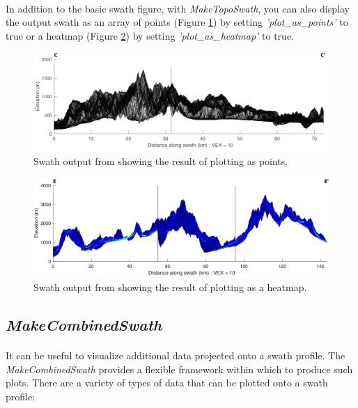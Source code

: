 \paragraph{}In addition to the basic swath figure, with \textit{MakeTopoSwath}, you can also display the output swath as an array of points (Figure \ref{fig:PointSwath}) by setting \textit{'plot\_as\_points'} to true or a heatmap (Figure \ref{fig:HeatSwath}) by setting \textit{'plot\_as\_heatmap'} to true.

\begin{figure}[H]
	\centering
	\includegraphics[width=16.5cm]{PNGs/SantAnaSwath_Points.png}
	\caption{Swath output from  showing the result of plotting as points.}
	\label{fig:PointSwath}
\end{figure}

\begin{figure}[H]
	\centering
	\includegraphics[width=16.5cm]{PNGs/Cross_SwathHeatmap.png}
	\caption{Swath output from  showing the result of plotting as a heatmap.}
	\label{fig:HeatSwath}
\end{figure}

\subsection{\textit{MakeCombinedSwath}} \label{sec:CombSwath}
\paragraph{}It can be useful to visualize additional data projected onto a swath profile. The \textit{MakeCombinedSwath} provides a flexible framework within which to produce such plots. There are a variety of types of data that can be plotted onto a swath profile:

